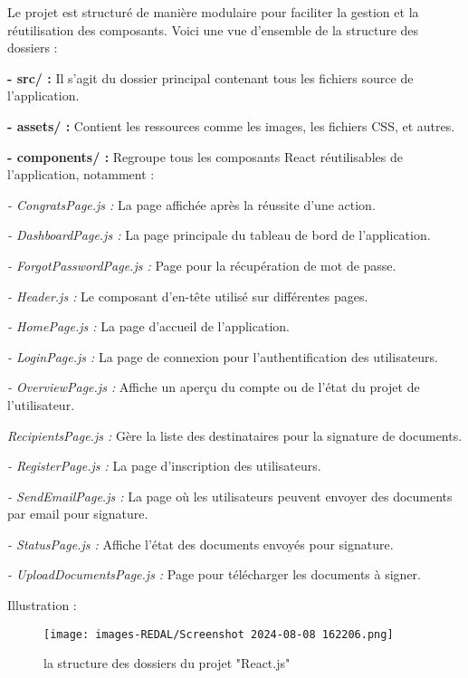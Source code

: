 Le projet est structuré de manière modulaire pour faciliter la gestion et la réutilisation des composants. Voici une vue d'ensemble de la structure des dossiers :

\textbf{- src/ :} Il s'agit du dossier principal contenant tous les fichiers source de l'application.

\textbf{- assets/ :} Contient les ressources comme les images, les fichiers CSS, et autres.

\textbf{- components/ :} Regroupe tous les composants React réutilisables de l'application, notamment :

\quad\textit{- CongratsPage.js :} La page affichée après la réussite d'une action.

\quad\textit{- DashboardPage.js :} La page principale du tableau de bord de l'application.

\quad\textit{- ForgotPasswordPage.js :} Page pour la récupération de mot de passe.

\quad\textit{- Header.js :} Le composant d'en-tête utilisé sur différentes pages.

\quad\textit{- HomePage.js :} La page d'accueil de l'application.

\quad\textit{- LoginPage.js :} La page de connexion pour l'authentification des utilisateurs.

\quad\textit{- OverviewPage.js :} Affiche un aperçu du compte ou de l'état du projet de l'utilisateur.

\quad\textit{RecipientsPage.js :} Gère la liste des destinataires pour la signature de documents.

\quad\textit{- RegisterPage.js :} La page d'inscription des utilisateurs.

\quad\textit{- SendEmailPage.js :} La page où les utilisateurs peuvent envoyer des documents par email pour signature.

\quad\textit{- StatusPage.js :} Affiche l'état des documents envoyés pour signature.

\quad\textit{- UploadDocumentsPage.js :} Page pour télécharger les documents à signer.

Illustration :


\begin{figure}[H]
\begin{center}
\texttt{[image: images-REDAL/Screenshot 2024-08-08 162206.png]}
\end{center}
\caption{la structure des dossiers du projet "React.js"}
\end{figure}

